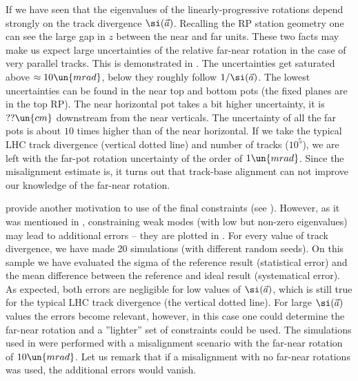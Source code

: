 If  we have seen that the eigenvalues of the linearly-progressive rotations depend strongly on the track divergence $\si(\vec a)$. Recalling the RP station geometry  one can see the large gap in $z$ between the near and far units. These two facts may make us expect large uncertainties of the relative far-near rotation in the case of very parallel tracks. This is demonstrated in . The uncertainties get saturated above $\approx 10\un{mrad}$, below they roughly follow $1/\si(\vec a)$. The lowest uncertainties can be found in the near top and bottom pots (the fixed planes are in the top RP). The near horizontal pot takes a bit higher uncertainty, it is $??\un{cm}$ downstream from the near verticals. The uncertainty of all the far pots is about $10$ times higher than of the near horizontal. If we take the typical LHC track divergence (vertical dotted line) and number of tracks ($10^5$), we are left with the far-pot rotation uncertainty of the order of $1\un{mrad}$. Since the misalignment estimate is, it turns out that track-base alignment can not improve our knowledge of the far-near rotation.


 provide another motivation to use of the final constraints (see ). However, as it was mentioned in , constraining weak modes (with low but non-zero eigenvalues) may lead to additional errors -- they are plotted in . For every value of track divergence, we have made 20 simulations (with different random seeds). On this sample we have evaluated the sigma of the reference result (statistical error) and the mean difference between the reference and ideal result (systematical error). As expected, both errors are negligible for low values of $\si(\vec a)$, which is still true for the typical LHC track divergence (the vertical dotted line). For large $\si(\vec a)$ values the errors become relevant, however, in this case one could determine the far-near rotation and a ''lighter'' set of constraints could be used. The simulations used in  were performed with a misalignment scenario with the far-near rotation of $10\un{mrad}$. Let us remark that if a misalignment with no far-near rotations was used, the additional errors would vanish.

